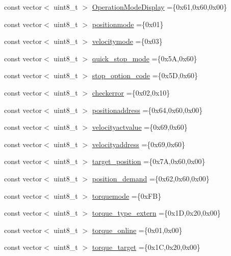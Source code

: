 \begin{DoxyCompactItemize}
\item 
const vector$<$ uint8\+\_\+t $>$ \hyperlink{namespaceod_a0469b45cd9158b638f0e0d6ed1102742}{Operation\+Mode\+Display} =\{0x61,0x60,0x00\}
\item 
const vector$<$ uint8\+\_\+t $>$ \hyperlink{namespaceod_a85efca0656a6714d7227858e112c4a73}{positionmode} =\{0x01\}
\item 
const vector$<$ uint8\+\_\+t $>$ \hyperlink{namespaceod_a2771fb30adf397c1cd2ddb092a414e82}{velocitymode} =\{0x03\}
\item 
const vector$<$ uint8\+\_\+t $>$ \hyperlink{namespaceod_ab5b4d34058d08a758277bf52cd31d8c9}{quick\+\_\+stop\+\_\+mode} =\{0x5\+A,0x60\}
\item 
const vector$<$ uint8\+\_\+t $>$ \hyperlink{namespaceod_af1bc07726906ffc6ea25ab9abb478143}{stop\+\_\+option\+\_\+code} =\{0x5\+D,0x60\}
\item 
const vector$<$ uint8\+\_\+t $>$ \hyperlink{namespaceod_ac4b980a10ae256ea019a767459b6ba9b}{checkerror} =\{0x02,0x10\}
\item 
const vector$<$ uint8\+\_\+t $>$ \hyperlink{namespaceod_a716df35f1a3cc3e1792c033be7fc0518}{positionaddress} =\{0x64,0x60,0x00\}
\item 
const vector$<$ uint8\+\_\+t $>$ \hyperlink{namespaceod_ad2c386d1f9bfc49b8a247f0b093f8963}{velocityactvalue} =\{0x69,0x60\}
\item 
const vector$<$ uint8\+\_\+t $>$ \hyperlink{namespaceod_adf45781fb80275c184d548ea793b376b}{velocityaddress} =\{0x69,0x60\}
\item 
const vector$<$ uint8\+\_\+t $>$ \hyperlink{namespaceod_a0bdcdb539c588cfae0d43cc0ba40ea05}{target\+\_\+position} =\{0x7\+A,0x60,0x00\}
\item 
const vector$<$ uint8\+\_\+t $>$ \hyperlink{namespaceod_a1d5963cb8a002987c96fae2e172790ee}{position\+\_\+demand} =\{0x62,0x60,0x00\}
\item 
const vector$<$ uint8\+\_\+t $>$ \hyperlink{namespaceod_a53c06ba9dc3fe72c8fd5fed43563a4a0}{torquemode} =\{0x\+F\+B\}
\item 
const vector$<$ uint8\+\_\+t $>$ \hyperlink{namespaceod_afc052d3983ca0866a0b8cd5d0fc5deaa}{torque\+\_\+type\+\_\+extern} =\{0x1\+D,0x20,0x00\}
\item 
const vector$<$ uint8\+\_\+t $>$ \hyperlink{namespaceod_ada58f32a60ef9137c7e9c4f4f54ace10}{torque\+\_\+online} =\{0x01,0x00\}
\item 
const vector$<$ uint8\+\_\+t $>$ \hyperlink{namespaceod_a3059829b7387e81bd7bad08c15364497}{torque\+\_\+target} =\{0x1\+C,0x20,0x00\}

\end{DoxyCompactItemize}
